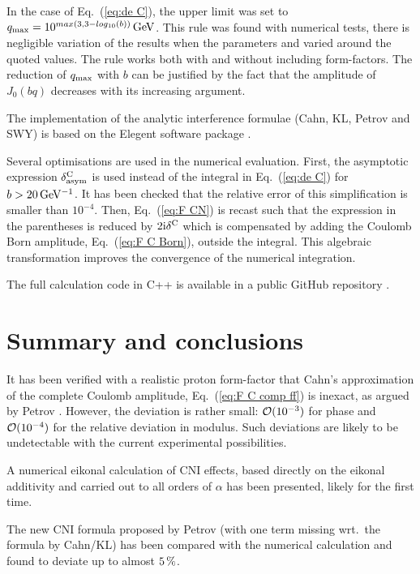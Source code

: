 \documentclass[pdftex,twocolumn,epjc3]{svjour3}
\def\un#1{\,{\rm #1}}
\def\I{{\rm i}}
\begin{document}
In the case of Eq.~(\ref{eq:de C}), the upper limit was set to $q_{\rm max} = 10^{max(3, 3 - log_{10}(b))} \un{GeV}$. This rule was found with numerical tests, there is negligible variation of the results when the parameters and varied around the quoted values. The rule works both with and without including form-factors. The reduction of $q_{\rm max}$ with $b$ can be justified by the fact that the amplitude of $J_0(bq)$ decreases with its increasing argument.

The implementation of the analytic interference formulae (Cahn, KL, Petrov and SWY) is based on the Elegent software package \cite{elegent}.

Several optimisations are used in the numerical evaluation. First, the asymptotic expression $\delta^{\rm C}_{\rm asym}$ is used instead of the integral in Eq.~(\ref{eq:de C}) for $b > 20\un{GeV^{-1}}$. It has been checked that the relative error of this simplification is smaller than $10^{-4}$. Then, Eq.~(\ref{eq:F CN}) is recast such that the expression in the parentheses is reduced by $2\I\delta^{\rm C}$ which is compensated by adding the Coulomb Born amplitude, Eq.~(\ref{eq:F C Born}), outside the integral. This algebraic transformation improves the convergence of the numerical integration.

The full calculation code in C++ is available in a public GitHub repository \cite{code}.




\section{Summary and conclusions}
\label{sec:summary}

It has been verified with a realistic proton form-factor that Cahn's approximation of the complete Coulomb amplitude, Eq.~(\ref{eq:F C comp ff}) is inexact, as argued by Petrov \cite{petrov2018}. However, the deviation is rather small: ${\cal O}(10^{-3})$ for phase and ${\cal O}(10^{-4})$ for the relative deviation in modulus. Such deviations are likely to be undetectable with the current experimental possibilities.

A numerical eikonal calculation of CNI effects, based directly on the eikonal additivity and carried out to all orders of $\alpha$ has been presented, likely for the first time.

The new CNI formula proposed by Petrov \cite{petrov2018} (with one term missing wrt.~the formula by Cahn/KL) has been compared with the numerical calculation and found to deviate up to almost $5\un{\%}$.
\end{document}
